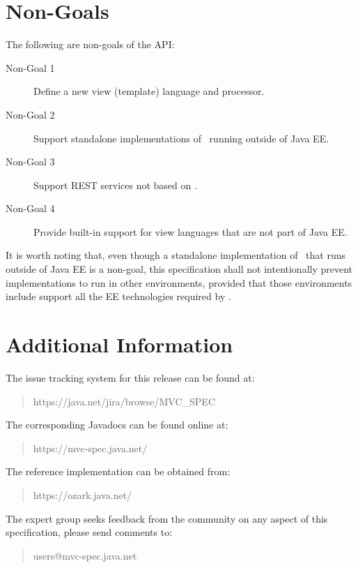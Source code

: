 \section{Non-Goals}
\label{non_goals}

The following are non-goals of the API:

\begin{description}
\item[Non-Goal 1] Define a new view (template) language and processor.
\item[Non-Goal 2] Support standalone implementations of \mvc\ running outside of Java EE.
\item[Non-Goal 3] Support REST services not based on \jaxrs.
\item[Non-Goal 4] Provide built-in support for view languages that are not part of Java EE.
\end{description}

It is worth noting that, even though a standalone implementation of \mvc\ that runs outside
of Java EE is a non-goal, this specification shall not intentionally prevent implementations
to run in other environments, provided that those environments include support all the 
EE technologies required by \mvc.

\section{Additional Information}
\label{additional_information}

The issue tracking system for this release can be found at:

\begin{quote}
https://java.net/jira/browse/MVC\_SPEC
\end{quote}

The corresponding Javadocs can be found online at:

\begin{quote}
https://mvc-spec.java.net/
\end{quote}

The reference implementation can be obtained from:

\begin{quote}
https://ozark.java.net/
\end{quote}

The expert group seeks feedback from the community on any aspect of this specification, please 
send comments to:

\begin{quote}
users@mvc-spec.java.net
\end{quote}

